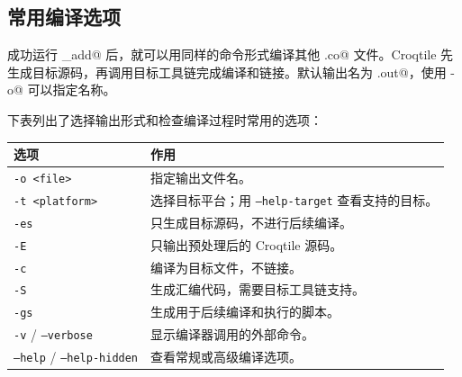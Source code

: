 \subsection*{常用编译选项}

成功运行 \co@ele_add@ 后，就可以用同样的命令形式编译其他 \co@.co@ 文件。Croqtile 先生成目标源码，再调用目标工具链完成编译和链接。默认输出名为 \co@a.out@，使用 \co@-o@ 可以指定名称。

下表列出了选择输出形式和检查编译过程时常用的选项：

\begin{table}[htbp]\centering\small
\begin{tabularx}{\linewidth}{@{}lX@{}}
\toprule
\textbf{选项} & \textbf{作用} \\
\midrule
\texttt{-o \textless{}file\textgreater{}} & 指定输出文件名。 \\
\texttt{-t \textless{}platform\textgreater{}} & 选择目标平台；用 \texttt{--help-target} 查看支持的目标。 \\
\texttt{-es} & 只生成目标源码，不进行后续编译。 \\
\texttt{-E} & 只输出预处理后的 Croqtile 源码。 \\
\texttt{-c} & 编译为目标文件，不链接。 \\
\texttt{-S} & 生成汇编代码，需要目标工具链支持。 \\
\texttt{-gs} & 生成用于后续编译和执行的脚本。 \\
\texttt{-v} / \texttt{--verbose} & 显示编译器调用的外部命令。 \\
\texttt{--help} / \texttt{--help-hidden} & 查看常规或高级编译选项。 \\
\bottomrule
\end{tabularx}
\end{table}
